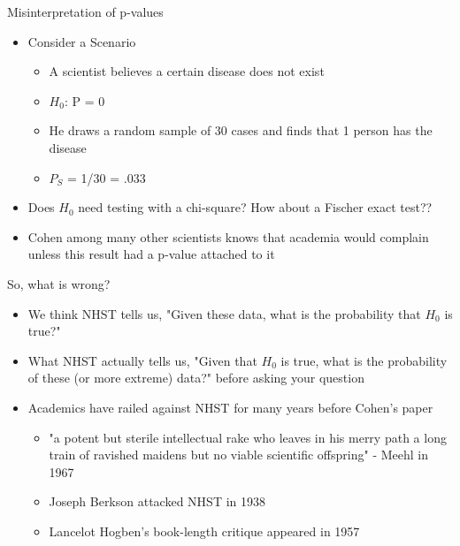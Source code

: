 \documentclass[aspectratio=169, 12pt]{beamer}
\begin{document}
\begin{frame}{Misinterpretation of p-values}
\begin{itemize} %
\item Consider a Scenario
   \begin{itemize}
   \item A scientist believes a certain disease does not exist 
   \item $H_0$: P = 0
   \item He draws a random sample of 30 cases and finds that 1 person has the disease
   \item $P_S$ = 1/30 = .033
   \end{itemize}
\item Does $H_0$ need testing with a chi-square? How about a Fischer exact test??
\item Cohen among many other scientists knows that academia would complain unless this result had a p-value attached to it
 \end{itemize}
\end{frame}

\begin{frame}{So, what is wrong?}
  \begin{itemize}
  \item We think NHST tells us, "Given these data, what is the probability that $H_0$ is true?"
  \item What NHST actually tells us, "Given that $H_0$ is true, what is the probability of these (or more extreme) data?"
    before asking your question
  \item Academics have railed against NHST for many years before Cohen's paper
    \begin{itemize}
    \item "a potent but sterile intellectual rake who leaves in his merry path a long train of ravished maidens but no viable scientific offspring" - Meehl in 1967
    \item Joseph Berkson attacked NHST in 1938
    \item Lancelot Hogben's book-length critique appeared in 1957
    \end{itemize}
  \end{itemize}
\end{frame}
\end{document}
